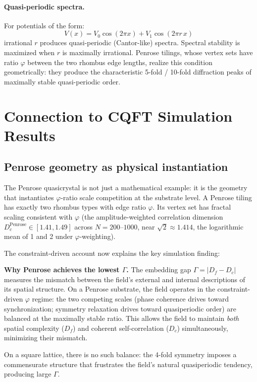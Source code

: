 \documentclass[11pt,a4paper]{article}
\theoremstyle{plain}
\theoremstyle{definition}
\newcommand{\phiGolden}{\varphi}
\begin{document}
\paragraph{Quasi-periodic spectra.}
For potentials of the form:
\begin{equation}
V(x) = V_0\cos(2\pi x) + V_1\cos(2\pi r\, x)
\end{equation}
irrational $r$ produces quasi-periodic (Cantor-like) spectra.
Spectral stability is maximized when $r$ is maximally irrational.
Penrose tilings, whose vertex sets have ratio $\phiGolden$ between
the two rhombus edge lengths, realize this condition geometrically:
they produce the characteristic 5-fold / 10-fold diffraction peaks
of maximally stable quasi-periodic order.

\section{Connection to CQFT Simulation Results}
\label{sec:penrose}

\subsection{Penrose geometry as physical instantiation}

The Penrose quasicrystal is not just a mathematical example: it is the
geometry that instantiates $\phiGolden$-ratio scale competition at the
substrate level. A Penrose tiling has exactly two rhombus types with
edge ratio $\phiGolden$. Its vertex set has fractal scaling consistent
with $\phiGolden$ (the amplitude-weighted correlation dimension
$D_c^{\text{Penrose}} \in [1.41, 1.49]$ across $N = 200$--$1000$,
near $\sqrt{2} \approx 1.414$, the logarithmic mean of 1 and 2 under
$\phiGolden$-weighting).

The constraint-driven account now explains the key simulation finding:

\begin{keybox}
\textbf{Why Penrose achieves the lowest $\Gamma$.}
The embedding gap $\Gamma = |D_f - D_c|$ measures the mismatch between
the field's external and internal descriptions of its spatial structure.
On a Penrose substrate, the field operates in the constraint-driven
$\phiGolden$ regime: the two competing scales (phase coherence drives
toward synchronization; symmetry relaxation drives toward quasiperiodic
order) are balanced at the maximally stable ratio. This allows the
field to maintain \emph{both} spatial complexity ($D_f$) and coherent
self-correlation ($D_c$) simultaneously, minimizing their mismatch.

On a square lattice, there is no such balance: the 4-fold symmetry
imposes a commensurate structure that frustrates the field's natural
quasiperiodic tendency, producing large $\Gamma$.
\end{keybox}
\end{document}

